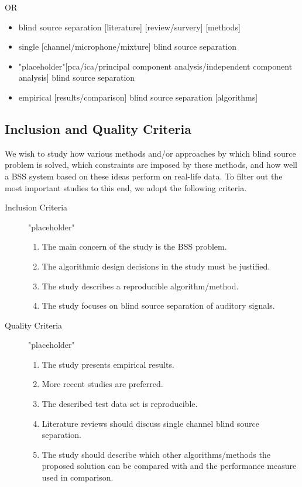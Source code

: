 \documentclass[11pt, oneside, a4paper]{article}
\begin{document}
OR

\begin{itemize}
 \item blind source separation [literature] [review/survery] [methods]
 \item single [channel/microphone/mixture] blind source separation
 \item "placeholder"[pca/ica/principal component analysis/independent component analysis] blind source separation
 \item empirical [results/comparison] blind source separation [algorithms]
\end{itemize}



\subsection{Inclusion and Quality Criteria}
We wish to study how various methods and/or approaches by which blind source problem is solved, which constraints are imposed by these methods, and how well a BSS system based on these ideas perform on real-life data. To filter out the most important studies to this end, we adopt the following criteria.

\begin{description}
	\item[Inclusion Criteria] "placeholder"
		\begin{enumerate}
			\item The main concern of the study is the BSS problem.
			\item The algorithmic design decisions in the study must be justified.
			\item The study describes a reproducible algorithm/method.
			\item The study focuses on blind source separation of auditory signals.
		\end{enumerate}
	\item[Quality Criteria] "placeholder"
		\begin{enumerate}
			\item The study presents empirical results.
			\item More recent studies are preferred.
			\item The described test data set is reproducible.
			\item Literature reviews should discuss single channel blind source separation.
			\item The study should describe which other algorithms/methods the proposed solution can be compared with and the performance measure used in comparison.
		\end{enumerate}
\end{description}
\end{document}
